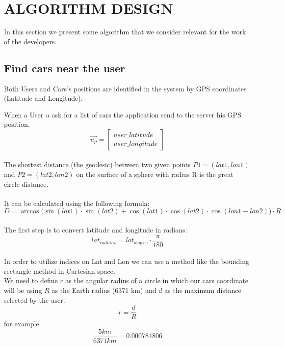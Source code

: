 \section{ALGORITHM DESIGN}
In this section we present some algorithm that we consider relevant for the work of the developers.

\subsection{Find cars near the user}
\label{algoritmo_posizione}
Both Users and Cars's positions are identified in the system by GPS coordinates (Latitude and Longitude).


\noindent When a User $u$ ask for a list of cars the application send to the server his GPS position. \begin{equation}
\vec{u_p} =\begin{bmatrix}user\_latitude \\ user\_longitude\end{bmatrix}
\end{equation}
\\
\noindent The shortest distance (the geodesic) between two given points $P1=(lat1, lon1)$ and $P2=(lat2, lon2)$ on the surface of a sphere with radius R is the great circle distance. 
\\\\
It can be calculated using the following formula:\\
\begin{equation}
D = \arccos\Big(
\sin(lat1) \cdot \sin(lat2) + \cos(lat1) \cdot \cos(lat2) \cdot \cos(lon1 - lon2)
\Big)\cdot R
\end{equation}
\\
\noindent The first step is to convert latitude and longitude in radians:\\
\begin{equation}
lat_{radians} = lat_{degree} \cdot \frac{\pi}{180}
\end{equation}
\\
In order to utilize indices on Lat and Lon we can use a method like the bounding rectangle method in Cartesian space.\\
\noindent We need to define $r$ as the angular radius of a circle in which our cars coordinate will be using $R$ as the Earth radius (6371 km) and $d$ as the maximum distance selected by the user.
\begin{equation}
	 r = \frac{d}{R}  
\end{equation}
for example $$ \frac{5 km}{6371 km} = 0.000784806$$

